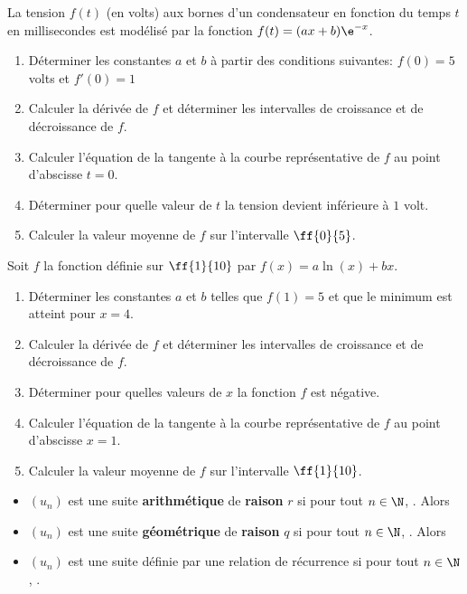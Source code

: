\begin{exercice_cours}{}

La tension $f(t)$ (en volts) aux bornes d'un condensateur en fonction du temps $t$ en millisecondes est modélisé par la fonction $f(t)=(ax+b)\e^{-x}$.


\begin{enumerate}
	\item Déterminer les constantes $a$ et $b$ à partir des conditions suivantes: $f(0)=5$ volts et $f'(0)=1$
	\item Calculer la dérivée de $f$ et déterminer les intervalles de croissance et de décroissance de $f$.

	\item Calculer l'équation de la tangente à la courbe représentative de $f$ au point d'abscisse $t=0$.
	\item Déterminer pour quelle valeur de $t$ la tension devient inférieure à $1$ volt.
	\item Calculer la valeur moyenne de $f$ sur l'intervalle $\ff{0}{5}$.
\end{enumerate}

\end{exercice_cours}





\begin{exercice_cours}{}

Soit $f$ la fonction définie sur $\ff{1}{10}$ par $f(x)=a\ln(x)+bx$.

\begin{enumerate}
	\item Déterminer les constantes $a$ et $b$ telles que $f(1)=5$ et que le minimum est atteint pour $x=4$.
	\item Calculer la dérivée de $f$ et déterminer les intervalles de croissance et de décroissance de $f$.
	\item Déterminer pour quelles valeurs de $x$ la fonction $f$ est négative.
	\item Calculer l'équation de la tangente à la courbe représentative de $f$ au point d'abscisse $x=1$.
	\item Calculer la valeur moyenne de $f$ sur l'intervalle $\ff{1}{10}$.
\end{enumerate}

\end{exercice_cours}


	\begin{easybox}{}
	\begin{itemize}
		\item $(u_n)$ est une suite \textbf{arithmétique} de \textbf{raison} $r$ si pour tout $n \in \N$, . Alors 
		\item $(u_n)$ est une suite \textbf{géométrique} de \textbf{raison} $q$ si pour tout $n \in \N$, . Alors  
		\item $(u_n)$ est une suite définie par une relation de récurrence si pour tout $n \in \N$, .
	\end{itemize}
\end{easybox}

